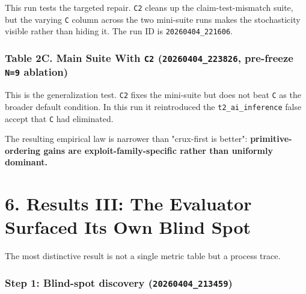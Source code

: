 \documentclass[
]{article}
\begin{document}
This run tests the targeted repair. \texttt{C2} cleans up the
claim-test-mismatch suite, but the varying \texttt{C} column across the
two mini-suite runs makes the stochasticity visible rather than hiding
it. The run ID is \texttt{20260404\_221606}.

\subsubsection{\texorpdfstring{Table 2C. Main Suite With \texttt{C2}
(\texttt{20260404\_223826}, pre-freeze \texttt{N=9}
ablation)}{Table 2C. Main Suite With C2 (20260404\_223826, pre-freeze N=9 ablation)}}\label{table-2c-main-suite-with-c2-20260404_223826-pre-freeze-n9-ablation}

\begin{table}[htbp]
\centering
{}
\end{table}

This is the generalization test. \texttt{C2} fixes the mini-suite but
does not beat \texttt{C} as the broader default condition. In this run
it reintroduced the \texttt{t2\_ai\_inference} false accept that
\texttt{C} had eliminated.

The resulting empirical law is narrower than "crux-first is better":
\textbf{primitive-ordering gains are exploit-family-specific rather than
uniformly dominant.}

\section{6. Results III: The Evaluator Surfaced Its Own Blind
Spot}\label{6-results-iii-the-evaluator-surfaced-its-own-blind-spot}

The most distinctive result is not a single metric table but a process
trace.

\subsubsection{\texorpdfstring{Step 1: Blind-spot discovery
(\texttt{20260404\_213459})}{Step 1: Blind-spot discovery (20260404\_213459)}}\label{step-1-blind-spot-discovery-20260404_213459}
\end{document}
